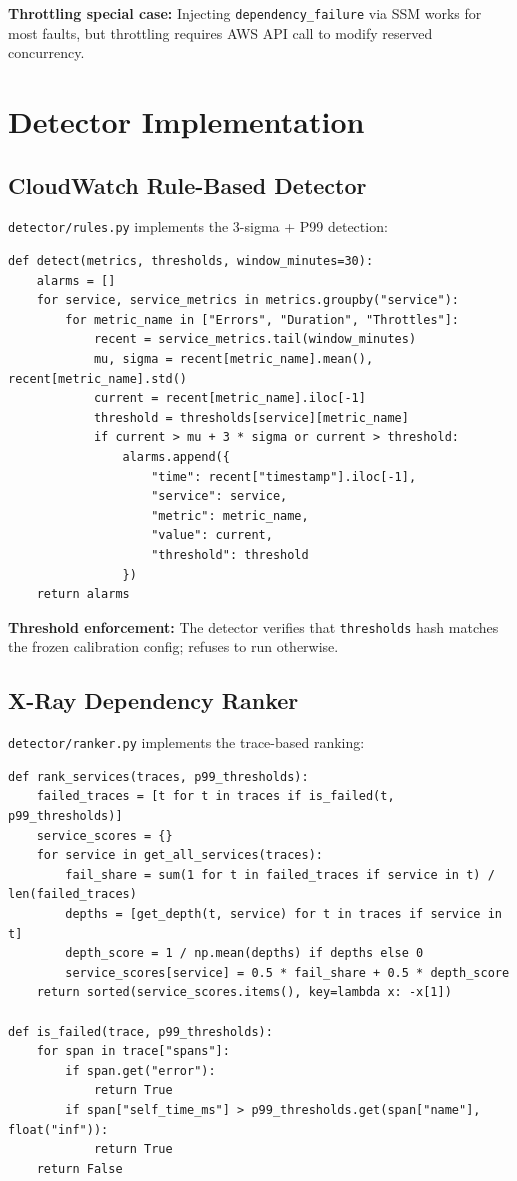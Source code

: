 \textbf{Throttling special case:} Injecting \texttt{dependency\_failure} via SSM works for most faults, but throttling requires AWS API call to modify reserved concurrency.

\section{Detector Implementation}

\subsection{CloudWatch Rule-Based Detector}

\texttt{detector/rules.py} implements the 3-sigma + P99 detection:

\begin{verbatim}
def detect(metrics, thresholds, window_minutes=30):
    alarms = []
    for service, service_metrics in metrics.groupby("service"):
        for metric_name in ["Errors", "Duration", "Throttles"]:
            recent = service_metrics.tail(window_minutes)
            mu, sigma = recent[metric_name].mean(), recent[metric_name].std()
            current = recent[metric_name].iloc[-1]
            threshold = thresholds[service][metric_name]
            if current > mu + 3 * sigma or current > threshold:
                alarms.append({
                    "time": recent["timestamp"].iloc[-1],
                    "service": service,
                    "metric": metric_name,
                    "value": current,
                    "threshold": threshold
                })
    return alarms
\end{verbatim}

\textbf{Threshold enforcement:} The detector verifies that \texttt{thresholds} hash matches the frozen calibration config; refuses to run otherwise.

\subsection{X-Ray Dependency Ranker}

\texttt{detector/ranker.py} implements the trace-based ranking:

\begin{verbatim}
def rank_services(traces, p99_thresholds):
    failed_traces = [t for t in traces if is_failed(t, p99_thresholds)]
    service_scores = {}
    for service in get_all_services(traces):
        fail_share = sum(1 for t in failed_traces if service in t) / len(failed_traces)
        depths = [get_depth(t, service) for t in traces if service in t]
        depth_score = 1 / np.mean(depths) if depths else 0
        service_scores[service] = 0.5 * fail_share + 0.5 * depth_score
    return sorted(service_scores.items(), key=lambda x: -x[1])

def is_failed(trace, p99_thresholds):
    for span in trace["spans"]:
        if span.get("error"):
            return True
        if span["self_time_ms"] > p99_thresholds.get(span["name"], float("inf")):
            return True
    return False
\end{verbatim}

